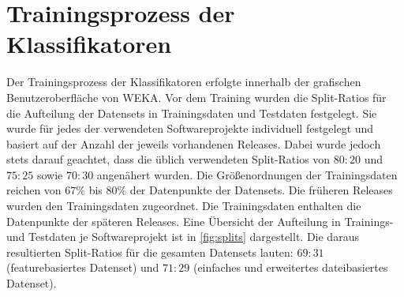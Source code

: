 
\section{Trainingsprozess der Klassifikatoren}

Der Trainingsprozess der Klassifikatoren erfolgte innerhalb der grafischen Benutzeroberfläche von WEKA. Vor dem Training wurden die Split-Ratios für die Aufteilung der Datensets in Trainingsdaten und Testdaten festgelegt. Sie wurde für jedes der verwendeten Softwareprojekte individuell festgelegt und basiert auf der Anzahl der jeweils vorhandenen Releases. Dabei wurde jedoch stets darauf geachtet, dass die üblich verwendeten Split-Ratios von $80:20$ und $75:25$ sowie $70:30$ angenähert wurden. Die Größenordnungen der Trainingsdaten reichen von $67\%$ bis $80\%$ der Datenpunkte der Datensets. Die früheren Releases wurden den Trainingsdaten zugeordnet. Die Trainingsdaten enthalten die Datenpunkte der späteren Releases. Eine Übersicht der Aufteilung in Trainings- und Testdaten je Softwareprojekt ist in \autoref{fig:splits} dargestellt. Die daraus resultierten Split-Ratios für die gesamten Datensets lauten: $69:31$ (featurebasiertes Datenset) und $71:29$ (\glqq einfaches\grqq{} und erweitertes dateibasiertes Datenset).

